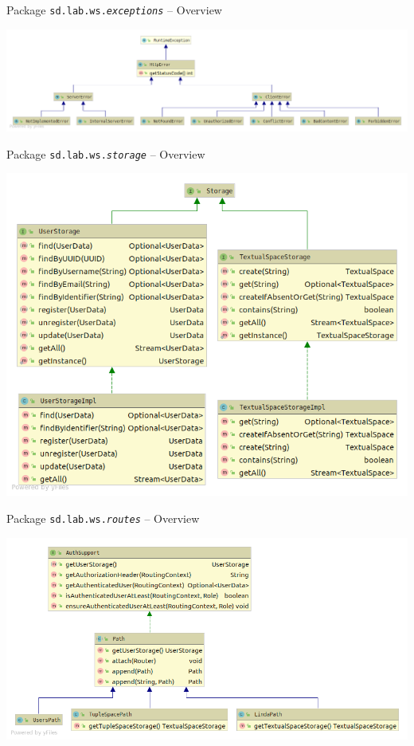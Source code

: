 \documentclass[presentation]{beamer}\mode<presentation>{\usetheme{AMSCesenaPurpleAndGold}}
\begin{document}
\begin{frame}{Package \texttt{sd.lab.ws.\textit{exceptions}} -- Overview}
    
    \centering
    \includegraphics[width=\linewidth]{img/pkg-exceptions.png}
    
\end{frame}

\begin{frame}{Package \texttt{sd.lab.ws.\textit{storage}} -- Overview}
    
    \centering
    \includegraphics[width=.7\linewidth]{img/pkg-storage.png}
    
\end{frame}

\begin{frame}{Package \texttt{sd.lab.ws.\textit{routes}} -- Overview}
    
    \centering
    \includegraphics[width=\linewidth]{img/pkg-routes.png}
    
\end{frame}
\end{document}
